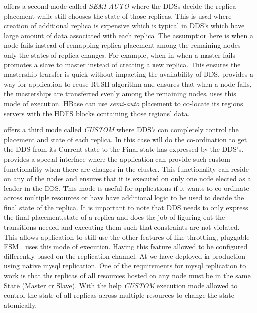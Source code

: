 \helix offers a second mode called \emph{SEMI-AUTO} where the DDSs decide the replica placement while \helix still chooses 
the state of those replicas. This is used where creation of additional replica is expensive which is typical in DDS's which have
 large amount of data associated with each replica. The assumption here is when a node fails instead of remapping replica placement 
 among the remaining nodes only the states of replica changes. For example, when in \espresso when a master fails \helix promotes
  a slave to master instead of creating a new replica. This ensures the mastership transfer is quick without impacting the availability 
  of DDS. \helix provides a way for application to reuse RUSH algorithm and
  ensures that when a node fails, the masterships are transferred evenly among
  the remaining nodes. \ES uses this mode of execution. HBase can use \emph{semi-auto} placement to co-locate its regions servers with the HDFS blocks
containing those regions' data.

\helix offers a third mode called \emph{CUSTOM} where DDS's can completely control the placement and state of each replica. In this 
case \helix will do the co-ordination to get the DDS from its Current state to the Final state has expressed by the DDS's. 
\helix provides a special interface where the application can provide such
custom functionality when there are changes in the cluster.
This functionality can reside on any of the nodes and \helix ensures that it is
executed on only one node elected as a leader in the DDS. This mode is useful
for applications if it wants to co-ordinate across multiple resources or have have additional logic to
be used to decide the final state of the replica. It is important to note that DDS needs to only express the final placement,state of a replica and \helix does the job of figuring out
 the transitions needed and executing them such that constraints are not violated. This allows 
application to still use the other features of \helix like throttling, pluggable FSM \etc. \seas uses this mode of execution. 
Having this feature allowed \ES to be configured differently based on the
replication channel. At \linkedin we have deployed \espresso in production using
native mysql replication. One of the requirements for mysql replication to work
is that the replicas of all resources hosted on any node must be in the
same State (Master or Slave).
With the help \emph{CUSTOM} execution mode \helix allowed \ES to control the state of all replicas across multiple resources to change the state atomically.

